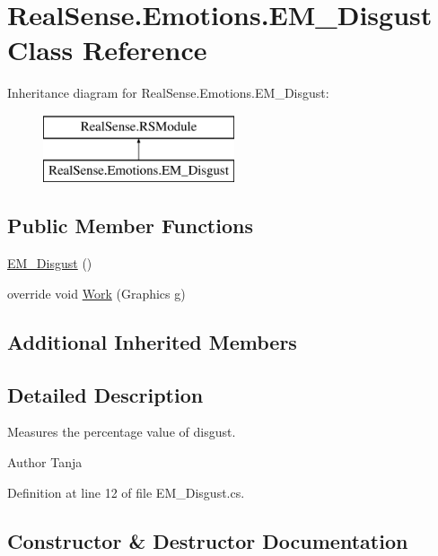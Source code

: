 \hypertarget{class_real_sense_1_1_emotions_1_1_e_m___disgust}{}\section{Real\+Sense.\+Emotions.\+E\+M\+\_\+\+Disgust Class Reference}
\label{class_real_sense_1_1_emotions_1_1_e_m___disgust}
Inheritance diagram for Real\+Sense.\+Emotions.\+E\+M\+\_\+\+Disgust\+:\begin{figure}[H]
\begin{center}
\leavevmode
\includegraphics[height=2.000000cm]{class_real_sense_1_1_emotions_1_1_e_m___disgust}
\end{center}
\end{figure}
\subsection*{Public Member Functions}
\begin{DoxyCompactItemize}
\item 
\hyperlink{class_real_sense_1_1_emotions_1_1_e_m___disgust_aba892f265a554ffe99c81482b48fbed0}{E\+M\+\_\+\+Disgust} ()
\item 
override void \hyperlink{class_real_sense_1_1_emotions_1_1_e_m___disgust_a22cbe3025c32821d53edcb325140ccb1}{Work} (Graphics g)
\end{DoxyCompactItemize}
\subsection*{Additional Inherited Members}


\subsection{Detailed Description}
Measures the percentage value of disgust. \begin{DoxyAuthor}{Author}
Tanja 
\end{DoxyAuthor}


Definition at line 12 of file E\+M\+\_\+\+Disgust.\+cs.



\subsection{Constructor \& Destructor Documentation}
\mbox{\label{class_real_sense_1_1_emotions_1_1_e_m___disgust_aba892f265a554ffe99c81482b48fbed0}} 
